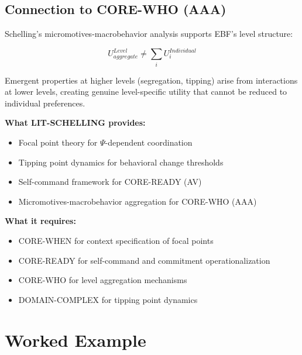 \subsection{Connection to CORE-WHO (AAA)}

Schelling's micromotives-macrobehavior analysis supports EBF's level structure:

\begin{equation}
U^{Level}_{aggregate} \neq \sum_i U^{Individual}_i
\label{eq:ts-levels}
\end{equation}

Emergent properties at higher levels (segregation, tipping) arise from
interactions at lower levels, creating genuine level-specific utility
that cannot be reduced to individual preferences.

\begin{tcolorbox}[colback=yellow!5!white, colframe=yellow!75!black,
    title=Integration: LIT-SCHELLING $\leftrightarrow$ EBF CORE]
\textbf{What LIT-SCHELLING provides:}
\begin{itemize}[nosep]
\item Focal point theory for $\Psi$-dependent coordination
\item Tipping point dynamics for behavioral change thresholds
\item Self-command framework for CORE-READY (AV)
\item Micromotives-macrobehavior aggregation for CORE-WHO (AAA)
\end{itemize}

\textbf{What it requires:}
\begin{itemize}[nosep]
\item CORE-WHEN for context specification of focal points
\item CORE-READY for self-command and commitment operationalization
\item CORE-WHO for level aggregation mechanisms
\item DOMAIN-COMPLEX for tipping point dynamics
\end{itemize}
\end{tcolorbox}


\section{Worked Example}
\label{sec:ts-example}

